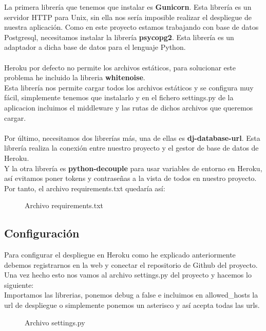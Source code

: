 La primera librería que tenemos que instalar es \textbf{Gunicorn}. Esta librería es un servidor HTTP para Unix, sin ella nos sería imposible realizar el despliegue de nuestra aplicación.
Como en este proyecto estamos trabajando con base de datos Postgresql, necesitamos instalar la librería \textbf{psycopg2}. Esta librería es un adaptador a dicha base de datos para el lenguaje Python.\\\\
Heroku por defecto no permite los archivos estáticos, para solucionar este problema he incluido la libreria \textbf{whitenoise}.\\
Esta librería nos permite cargar todos los archivos estáticos y se configura muy fácil, simplemente tenemos que instalarlo y en
el fichero settings.py de la aplicacion incluimos el middleware y las rutas de dichos archivos que queremos cargar.\\\\
Por último, necesitamos dos librerías más, una de ellas es \textbf{dj-database-url}. Esta librería realiza la conexión entre nuestro proyecto y el gestor de base de datos de Heroku.\\
Y la otra librería es \textbf{python-decouple} para usar variables de entorno en Heroku, así evitamos poner tokens y contraseñas a la vista de todos en nuestro proyecto. \\

Por tanto, el archivo requirements.txt quedaría así:
\begin{figure}[H]
  \centering
  \noindent{}
  \caption{Archivo requirements.txt}
\end{figure}


\subsection{Configuración}

Para configurar el despliegue en Heroku como he explicado anteriormente debemos registrarnos en la web y conectar el repositorio de Github del proyecto.
Una vez hecho esto nos vamos al archivo settings.py del proyecto y hacemos lo siguiente:\\
Importamos las librerias, ponemos debug a false e incluimos en allowed\_hosts la url de despliegue o simplemente ponemos un asterisco y así acepta todas las urls.

\begin{figure}[H]
  \centering
  \noindent{}
  \caption{Archivo settings.py}
\end{figure}

